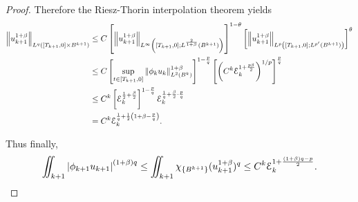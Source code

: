 \begin{proof}
Therefore the Riesz-Thorin interpolation theorem yields
\begin{align*}
\left\lVert u_{k+1}^{1+\beta}\right\rVert_{L^q\left([T_{k+1},0]\times B^{k+1}\right)} &\leq C \left[ \left\lVert u_{k+1}^{1+\beta} \right\rVert_{L^\infty\left([T_{k+1},0];L^\frac{2}{1+\beta}(B^{k+1})\right)} \right]^{1 - \theta} \left[ \left\lVert u_{k+1}^{1+\beta} \right\rVert_{L^p\left([T_{k+1},0];L^{p'}(B^{k+1})\right)} \right]^\theta
\\ &\leq C \left[ \sup_{t \in [T_{k+1},0]} \left\lVert\phi_k u_k\right\rVert_{L^2(B^k)}^{1+\beta} \right]^{1-\frac{p}{q}} \left[ \left( C^k\mathcal{E}_k^{1 + \frac{p\beta}{2}} \right)^{1/p} \right]^\frac{p}{q} 
\\ &\leq C^k \left[\mathcal{E}_k^{\frac{1}{2} + \frac{\beta}{2}} \right]^{1-\frac{p}{q}} \mathcal{E}_k^{\frac{1}{q} + \frac{\beta}{2} \cdot \frac{p}{q}}
\\ &= C^k \mathcal{E}_k^{\frac{1}{q} + \frac{1}{2}\left( 1+\beta-\frac{p}{q} \right)}. 
\end{align*}


Thus finally, 
\begin{equation} \label{q_leq_E}
\iint_{k+1} \left\lvert \phi_{k+1}u_{k+1} \right\rvert^{(1+\beta)q} \leq \iint_{k+1} \chi_{\{B^{k+1}\}} (u_{k+1}^{1+\beta})^q \leq C^k \mathcal{E}_k^{1 + \frac{(1+\beta)q-p}{2}}.
\end{equation}


%


\end{proof}
